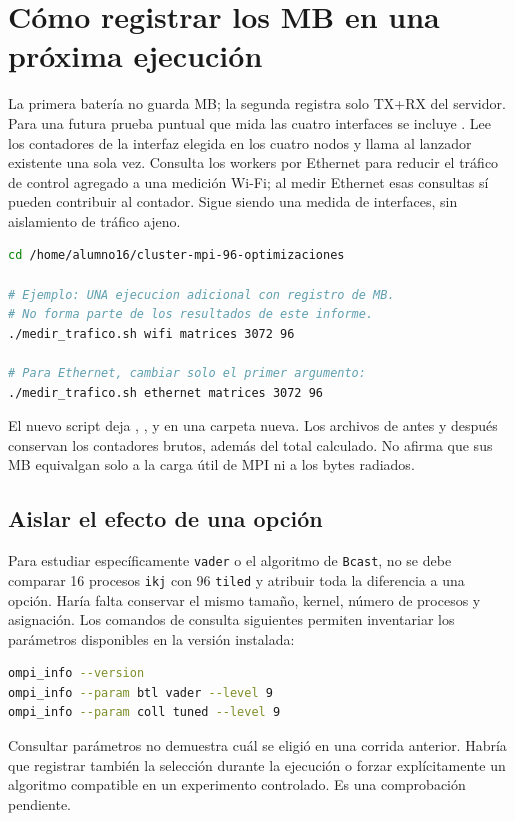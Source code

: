 \section{Cómo registrar los MB en una próxima ejecución}

La primera batería no guarda MB; la segunda registra solo TX+RX del servidor. Para una futura prueba puntual que mida las cuatro interfaces se incluye . Lee los contadores de la interfaz elegida en los cuatro nodos y llama al lanzador existente una sola vez. Consulta los workers por Ethernet para reducir el tráfico de control agregado a una medición Wi-Fi; al medir Ethernet esas consultas sí pueden contribuir al contador. Sigue siendo una medida de interfaces, sin aislamiento de tráfico ajeno.

\begin{lstlisting}[language=bash]
cd /home/alumno16/cluster-mpi-96-optimizaciones

# Ejemplo: UNA ejecucion adicional con registro de MB.
# No forma parte de los resultados de este informe.
./medir_trafico.sh wifi matrices 3072 96

# Para Ethernet, cambiar solo el primer argumento:
./medir_trafico.sh ethernet matrices 3072 96
\end{lstlisting}
El nuevo script deja , ,  y  en una carpeta nueva. Los archivos de antes y después conservan los contadores brutos, además del total calculado. No afirma que sus MB equivalgan solo a la carga útil de MPI ni a los bytes radiados.

\subsection{Aislar el efecto de una opción}
Para estudiar específicamente \texttt{vader} o el algoritmo de \texttt{Bcast}, no se debe comparar 16 procesos \texttt{ikj} con 96 \texttt{tiled} y atribuir toda la diferencia a una opción. Haría falta conservar el mismo tamaño, kernel, número de procesos y asignación. Los comandos de consulta siguientes permiten inventariar los parámetros disponibles en la versión instalada:
\begin{lstlisting}[language=bash]
ompi_info --version
ompi_info --param btl vader --level 9
ompi_info --param coll tuned --level 9
\end{lstlisting}
Consultar parámetros no demuestra cuál se eligió en una corrida anterior. Habría que registrar también la selección durante la ejecución o forzar explícitamente un algoritmo compatible en un experimento controlado. Es una comprobación pendiente.

